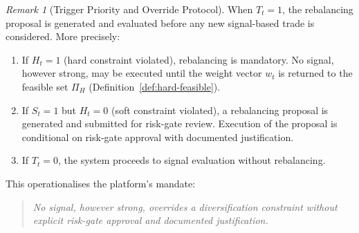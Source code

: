 \documentclass[12pt,openany]{book}
\newcommand{\bfw}{\mathbf{w}}
\numberwithin{equation}{chapter}
\theoremstyle{plain}
\theoremstyle{definition}
\theoremstyle{remark}
\newtheorem{remark}[theorem]{Remark}
\def\bfw{w}%
\begin{document}
\begin{remark}[Trigger Priority and Override Protocol]
\label{rem:trigger-priority}
When $T_t = 1$, the rebalancing proposal is generated and
evaluated before any new signal-based trade is considered.
More precisely:
\begin{enumerate}
  \item If $H_t = 1$ (hard constraint violated), rebalancing is
        mandatory.  No signal, however strong, may be executed
        until the weight vector $\bfw_t$ is returned to the
        feasible set $\Pi_H$ (Definition~\ref{def:hard-feasible}).

  \item If $S_t = 1$ but $H_t = 0$ (soft constraint violated),
        a rebalancing proposal is generated and submitted for
        risk-gate review.  Execution of the proposal is
        conditional on risk-gate approval with documented
        justification.

  \item If $T_t = 0$, the system proceeds to signal evaluation
        without rebalancing.
\end{enumerate}
This operationalises the platform's mandate:
\begin{quote}
\emph{No signal, however strong, overrides a diversification
constraint without explicit risk-gate approval and documented
justification.}
\end{quote}
\end{remark}
\end{document}
